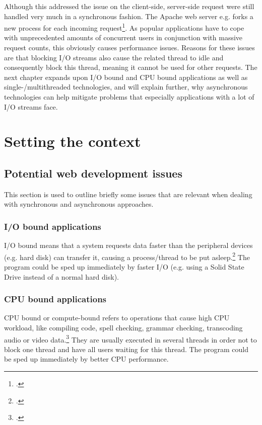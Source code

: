 Although this addressed the issue on the client-side, server-side request were
still handled very much in a synchronous fashion. The Apache web server e.g.
forks a new process for each incoming request\footcite[Cf.][]{apache_2013}.
As popular applications have to cope with unprecedented amounts of concurrent
users in conjunction with massive request counts, this obviously causes
performance issues. Reasons for these issues are that blocking I/O streams also
cause the related thread to idle and consequently block this thread, meaning it
cannot be used for other requests. The next chapter expands upon I/O bound and
CPU bound applications as well as single-/multithreaded technologies, and will
explain further, why asynchronous technologies can help mitigate problems that
especially applications with a lot of I/O streams face.\\

\newpage
\section{Setting the context}
\label{setting_the_context}

\subsection{Potential web development issues}
\label{potentialissues}
This section is used to outline briefly some issues that are relevant when dealing with synchronous and asynchronous approaches.

\subsubsection{I/O bound applications}
\label{issue_io}
I/O bound means that a system requests data faster than the peripheral devices
(e.g. hard disk) can transfer it, causing a process/thread to be put
asleep.\footcite[Cf.][10]{Caldera_2003} The program could be sped up immediately
by faster I/O (e.g. using a Solid State Drive instead of a normal hard disk).

\subsubsection{CPU bound applications}
\label{issue_cpu}
CPU bound or compute-bound refers to operations that cause high CPU workload,
like compiling code, spell checking, grammar checking, transcoding audio or
video data.\footcite[Cf.][718]{Richter_2010} They are usually executed in
several threads in order not to block one thread and have all users waiting for
this thread. The program could be sped up immediately by better CPU performance.

